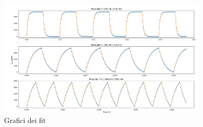 \documentclass{article}[a4paper, oneside,11pt]
\begin{document}
    \begin{figure}[H]
        \centering
        \includegraphics[width=0.9\textwidth]{img/Fit.png}
        \caption{Grafici dei fit}
    \end{figure}
\end{document}
